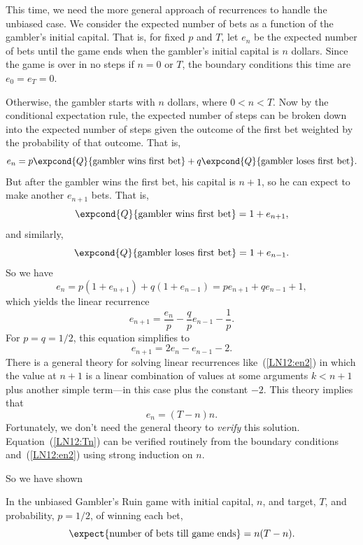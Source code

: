 \begin{staffnotes}
This time, we need the more general approach of recurrences to handle the
unbiased case.  We consider the expected number of bets as a
function of the gambler's initial capital.  That is, for fixed $p$ and $T$,
let $e_n$ be the expected number of bets until the game ends when the
gambler's initial capital is $n$ dollars.  Since the game is over in no
steps if $n=0$ or $T$, the boundary conditions this time are $e_0=e_T=0$.

Otherwise, the gambler starts with $n$ dollars, where $0 < n < T$.
Now by the conditional expectation rule, the expected number of steps can
be broken down into the expected number of steps given the outcome of the
first bet weighted by the probability of that outcome.  That is,
\[
e_n = p\expcond{Q}{\text{gambler wins first bet}} +
q\expcond{Q}{\text{gambler loses first bet}}.
\]
But after the gambler wins the first bet, his capital is $n+1$, so
he can expect to make another $e_{n+1}$ bets.  That is,
\[
\expcond{Q}{\text{gambler wins first bet}} = 1 + e_{n+1},
\]
and similarly, 
\[
\expcond{Q}{\text{gambler loses first bet}} = 1 + e_{n-1}.
\]
So we have
\[
e_n =  p(1 + e_{n+1}) +  q(1 + e_{n-1}) =  pe_{n+1} + qe_{n-1} + 1, 
\]
which yields the linear recurrence
\[
e_{n+1} = \frac{e_n}{p} - \frac{q}{p} e_{n-1} - \frac{1}{p}.
\]
For $p = q = 1/2$, this equation simplifies to
\begin{equation}\label{LN12:en2}
e_{n+1} = 2e_n - e_{n-1} - 2.
\end{equation}
There is a general theory for solving linear recurrences like~(\ref{LN12:en2})
in which the value at $n+1$ is a linear combination of values at some
arguments $k<n+1$ plus another simple term---in this case plus the constant
$-2$.  This theory implies that
\begin{equation}\label{LN12:Tn}
e_n  = (T - n)n.
\end{equation}
Fortunately, we don't need the general theory to \emph{verify} this
solution.  Equation~(\ref{LN12:Tn}) can be verified routinely from the boundary
conditions and~(\ref{LN12:en2}) using strong induction on $n$.

So we have shown
\begin{theorem}\label{LN12:fairtime}
In the unbiased Gambler's Ruin game with initial capital, $n$, and target,
$T$, and probability, $p = 1/2$, of winning each bet,
\begin{equation}
\expect{\text{number of bets till game ends}} = n(T-n).
\end{equation}
\end{theorem}


\end{staffnotes}
